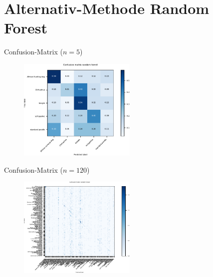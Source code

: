   \section{Alternativ-Methode Random Forest}

  \begin{frame}[noframenumbering]
    \tableofcontents[currentsection]
  \end{frame}


  \begin{frame}{Confusion-Matrix ($n = 5$)}
    \begin{figure}
      \centering
      \includegraphics[width=0.5\textwidth]{logos/RF/confusion_matrix_rf.pdf}
      \label{fig:cm_rf}
    \end{figure}
  \end{frame}

  \begin{frame}{Confusion-Matrix ($n = 120$)}
    \begin{figure}
      \centering
      \includegraphics[width=0.5\textwidth]{logos/RF/confusion_matrix_big.pdf}
      \label{fig:cm_rf_big}
    \end{figure}
  \end{frame}


